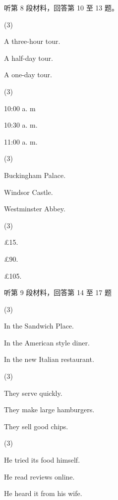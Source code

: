 \documentclass{英语试卷}
\begin{document}
\par 听第 8 段材料，回答第 10 至 13 题。\par
{}
\begin{choices}(3)
  \item A three-hour tour.
  \item A half-day tour.
  \item A one-day tour.
\end{choices}
\begin{choices}(3)
  \item 10:00 a. m
  \item 10:30 a. m.
  \item 11:00 a. m.
\end{choices}
\begin{choices}(3)
  \item Buckingham Palace.
  \item Windsor Castle.
  \item Westminster Abbey.
\end{choices}
\begin{choices}(3)
  \item £15.
  \item £90.
  \item £105.
\end{choices}
\par 听第 9 段材料，回答第 14 至 17 题\par
{}
\begin{choices}(3)
  \item In the Sandwich Place.
  \item In the American style diner.
  \item In the new Italian restaurant.
\end{choices}
\begin{choices}(3)
  \item They serve quickly.
  \item They make large hamburgers.
  \item They sell good chips.
\end{choices}
\begin{choices}(3)
  \item He tried its food himself.
  \item He read reviews online.
  \item He heard it from his wife.
\end{choices}
\end{document}

